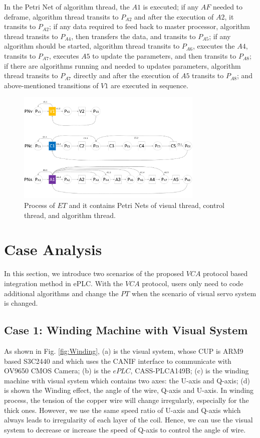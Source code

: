 \documentclass[journal,UTF8]{IEEEtran}
\begin{document}
In the Petri Net of algorithm thread, the $A1$ is executed; if any $AF$ needed to deframe, algorithm thread transits to $P_{A2}$ and after the execution of $A2$, it transits to $P_{A2}$; if any data required to feed back to master processor, algorithm thread transits to $P_{A4}$, then transfers the data, and transits to $P_{A5}$; if any algorithm should be started, algorithm thread transits to $P_{A6}$, executes the $A4$, transits to $P_{A7}$, executes $A5$ to update the parameters, and then transits to $P_{A8}$; if there are algorithms running and needed to updates parameters, algorithm thread transits to $P_{A7}$ directly and after the execution of $A5$ transits to $P_{A8}$; and above-mentioned transitions of $V1$ are executed in sequence.               

\begin{figure}
	\centering
	\includegraphics[width=3.5in]{fig/ThreadExecution.pdf}
	\caption{ Process of $ET$ and it contains Petri Nets of visual thread, control thread, and algorithm thread.}
	\label{fig:threadExecution}
\end{figure}

\section{Case Analysis}
\label{Case}
In this section, we introduce two scenarios of the proposed $VCA$ protocol based integration method in ePLC. With the $VCA$ protocol, users only need to code additional algorithms and change the $PT$ when the scenario of visual servo system is changed. 

\subsection{Case 1: Winding Machine with Visual System}
  
As shown in Fig. \ref{fig:Winding}, (a) is the visual system, whose CUP is ARM9 based S3C2440 and which uses the CANIF interface to communicate with OV9650 CMOS Camera; (b) is the $ePLC$, CASS-PLCA149B; (c) is the winding machine with visual system which contains two axes: the U-axis and Q-axis; (d) is shown the Winding effect, the angle of the wire, Q-axis and U-axis. In winding process, the tension of the copper wire will change irregularly, especially for the thick ones. However, we use the same speed ratio of U-axis and Q-axis which always leads to irregularity of each layer of the coil. Hence, we can use the visual system to decrease or increase the speed of Q-axis to control the angle of wire. 
\end{document}
